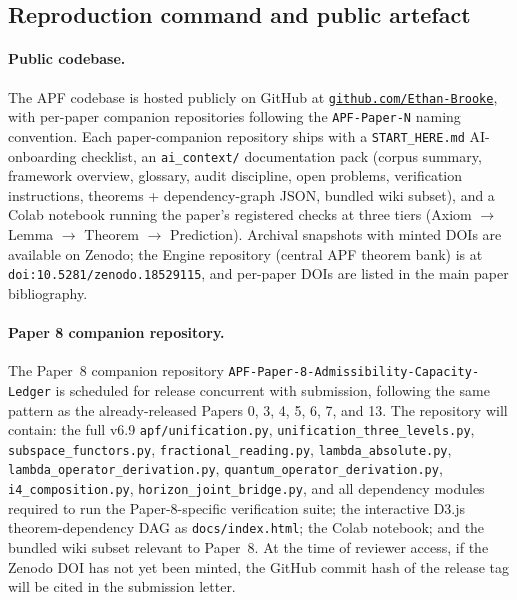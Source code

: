 \documentclass[11pt]{article}
\theoremstyle{plain}
\theoremstyle{definition}
\theoremstyle{remark}
\begin{document}
\bigskip

\subsection{Reproduction command and public artefact}\label{supp:L1}

\paragraph{Public codebase.}  The APF codebase is hosted publicly on GitHub at \href{https://github.com/Ethan-Brooke}{\texttt{github.com/Ethan-Brooke}}, with per-paper companion repositories following the \texttt{APF-Paper-N} naming convention.  Each paper-companion repository ships with a \texttt{START\_HERE.md} AI-onboarding checklist, an \texttt{ai\_context/} documentation pack (corpus summary, framework overview, glossary, audit discipline, open problems, verification instructions, theorems + dependency-graph JSON, bundled wiki subset), and a Colab notebook running the paper's registered checks at three tiers (Axiom $\to$ Lemma $\to$ Theorem $\to$ Prediction).  Archival snapshots with minted DOIs are available on Zenodo; the Engine repository (central APF theorem bank) is at \texttt{doi:10.5281/zenodo.18529115}, and per-paper DOIs are listed in the main paper bibliography.

\paragraph{Paper 8 companion repository.}  The Paper~8 companion repository \texttt{APF-Paper-8-Admissibility-Capacity-Ledger} is scheduled for release concurrent with submission, following the same pattern as the already-released Papers 0, 3, 4, 5, 6, 7, and 13.  The repository will contain: the full v6.9 \texttt{apf/unification.py}, \texttt{unification\_three\_levels.py}, \texttt{subspace\_functors.py}, \texttt{fractional\_reading.py}, \texttt{lambda\_absolute.py}, \texttt{lambda\_operator\_derivation.py}, \texttt{quantum\_operator\_derivation.py}, \texttt{i4\_composition.py}, \texttt{horizon\_joint\_bridge.py}, and all dependency modules required to run the Paper-8-specific verification suite; the interactive D3.js theorem-dependency DAG as \texttt{docs/index.html}; the Colab notebook; and the bundled wiki subset relevant to Paper~8.  At the time of reviewer access, if the Zenodo DOI has not yet been minted, the GitHub commit hash of the release tag will be cited in the submission letter.
\end{document}

